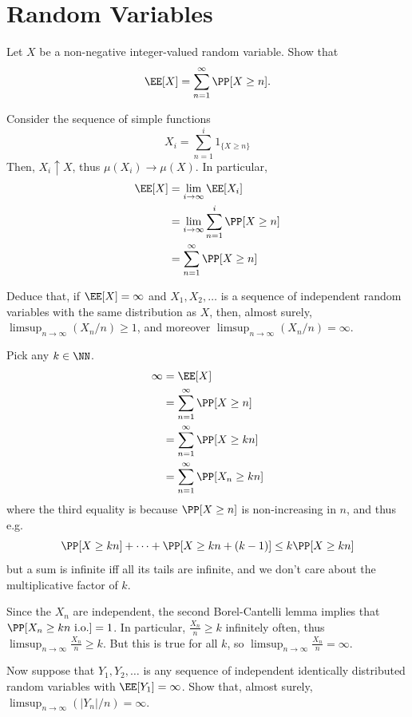 \documentclass[11pt, headheight=30pt]{scrartcl}
\begin{document}
\section{Random Variables}
\begin{prob}
    Let $X$ be a non-negative integer-valued random variable.
    Show that
    \[
        \EE[X] = \sum_{n=1}^\infty \PP[X \geq n].
    \]
\end{prob}
Consider the sequence of simple functions
\[
    X_i = \sum_{n=1}^i 1_{\{X\geq n\}}  
\]
Then, $X_i\uparrow X$, thus $\mu(X_i)\to \mu(X)$.
In particular,
\begin{align*}
    \EE[X] &= \lim_{i\to \infty} \EE[X_i]\\
    &= \lim_{i\to \infty} \sum_{n=1}^i \PP[X\geq n]\\
    &= \sum_{n=1}^\infty \PP[X\geq n]
\end{align*}

\begin{prob}
    Deduce that, if $\EE[X] = \infty$ and $X_1, X_2, \ldots$
    is a sequence of independent random variables with the
    same distribution as $X$, then, almost surely,
    $\limsup_{n \to \infty}(X_n/n) \geq 1$,
    and moreover $\limsup_{n \to \infty}(X_n/n) = \infty$.
\end{prob}

Pick any $k \in \NN$.
\begin{align*}
    \infty &= \EE[X]\\
    &= \sum_{n=1}^\infty \PP[X\geq n]\\
    &= \sum_{n = 1}^\infty \PP[X\geq kn]\\
    &= \sum_{n = 1}^\infty \PP[X_n\geq kn]
\end{align*}
where the third equality is because $\PP[X\geq n]$
is non-increasing in $n$, and thus e.g.
\[
    \PP[X\geq kn] + \cdots + \PP[X\geq kn + (k-1)] \leq k\PP[X\geq kn]    
\]
but a sum is infinite iff all its tails are infinite, and
we don't care about the multiplicative factor of $k$.

Since the $X_n$ are independent, the second Borel-Cantelli lemma
implies that $\PP[X_n\geq kn \text{ i.o.}] = 1$.
In particular, $\frac{X_n}{n} \geq k$ infinitely often,
thus $\limsup_{n\to \infty} \frac{X_n}{n} \geq k$.
But this is true for all $k$, so $\limsup_{n\to \infty} \frac{X_n}{n} = \infty$.

\begin{prob}
    Now suppose that $Y_1, Y_2, \ldots$ is any sequence of
    independent identically distributed random variables with
    $\EE[Y_1] = \infty$. Show that, almost surely,
    $\limsup_{n \to \infty}(|Y_n|/n) = \infty$.
\end{prob}
\end{document}
